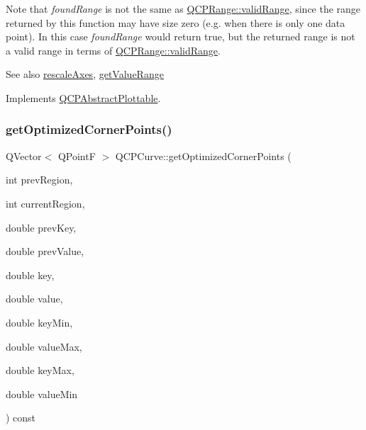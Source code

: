 Note that {\itshape found\+Range} is not the same as \mbox{\hyperlink{class_q_c_p_range_ab38bd4841c77c7bb86c9eea0f142dcc0}{Q\+C\+P\+Range\+::valid\+Range}}, since the range returned by this function may have size zero (e.\+g. when there is only one data point). In this case {\itshape found\+Range} would return true, but the returned range is not a valid range in terms of \mbox{\hyperlink{class_q_c_p_range_ab38bd4841c77c7bb86c9eea0f142dcc0}{Q\+C\+P\+Range\+::valid\+Range}}.

\begin{DoxySeeAlso}{See also}
\mbox{\hyperlink{class_q_c_p_abstract_plottable_a1491c4a606bccd2d09e65e11b79eb882}{rescale\+Axes}}, \mbox{\hyperlink{class_q_c_p_curve_a8bb8e3b9085f15921dc40483fb025ab2}{get\+Value\+Range}} 
\end{DoxySeeAlso}


Implements \mbox{\hyperlink{class_q_c_p_abstract_plottable_a4da16d3cd4b509e1104a9b0275623c96}{Q\+C\+P\+Abstract\+Plottable}}.

\mbox{\label{class_q_c_p_curve_a66bff7933dac149c4577ad63a27da924}} 
\subsubsection{\texorpdfstring{getOptimizedCornerPoints()}{getOptimizedCornerPoints()}}
{\footnotesize\ttfamily Q\+Vector$<$ Q\+PointF $>$ Q\+C\+P\+Curve\+::get\+Optimized\+Corner\+Points (\begin{DoxyParamCaption}\item[{int}]{prev\+Region,  }\item[{int}]{current\+Region,  }\item[{double}]{prev\+Key,  }\item[{double}]{prev\+Value,  }\item[{double}]{key,  }\item[{double}]{value,  }\item[{double}]{key\+Min,  }\item[{double}]{value\+Max,  }\item[{double}]{key\+Max,  }\item[{double}]{value\+Min }\end{DoxyParamCaption}) const\hspace{0.3cm}{\ttfamily [protected]}}

